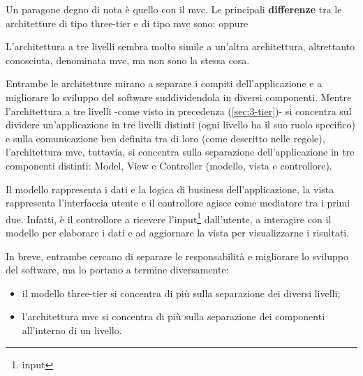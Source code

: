 Un paragone degno di nota è quello con il \acrfull{mvc}. Le principali \textbf{differenze} tra le architetture di tipo three-tier e di tipo \acrshort{mvc} sono:
\newline\newline oppure\newline

L'architettura a tre livelli sembra molto simile a un'altra architettura, altrettanto conosciuta, denominata \acrfull{mvc}, ma non sono la stessa cosa.

Entrambe le architetture mirano a separare i compiti dell'applicazione e a migliorare lo sviluppo del software suddividendola in diversi componenti.
Mentre l'architettura a tre livelli -come visto in precedenza (\ref{sec:3-tier})- si concentra sul dividere un'applicazione in tre livelli distinti (ogni livello ha il suo ruolo specifico) e sulla comunicazione ben definita tra di loro (come descritto nelle regole), l'architettura \acrshort{mvc}, tuttavia, si concentra sulla separazione dell'applicazione in tre componenti distinti: Model, View e Controller (modello, vista e controllore).

Il modello rappresenta i dati e la logica di business dell'applicazione, la vista rappresenta l'interfaccia utente e il controllore agisce come mediatore tra i primi due. Infatti, è il controllore a ricevere l'input\footnote{\glsdesc{input}} dall'utente, a interagire con il modello per elaborare i dati e ad aggiornare la vista per visualizzarne i risultati.

In breve, entrambe cercano di separare le responsabilità e migliorare lo sviluppo del software, ma lo portano a termine diversamente: 
\begin{itemize}
    \item il modello three-tier si concentra di più sulla separazione dei diversi livelli;
    \item l'architettura \acrshort{mvc} si concentra di più sulla separazione dei componenti all'interno di un livello.
\end{itemize}


